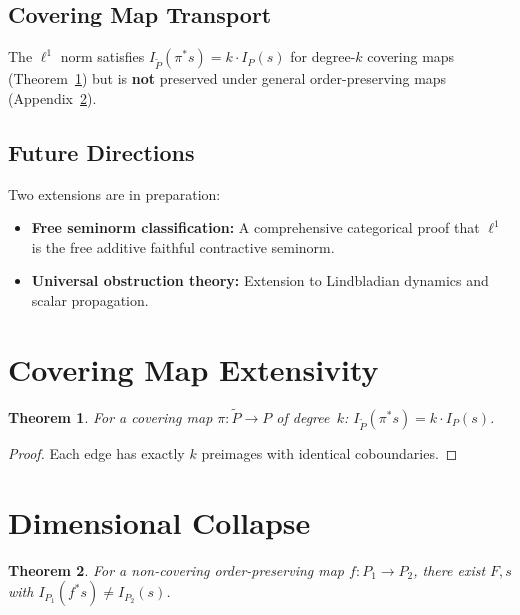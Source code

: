 \documentclass[12pt,a4paper]{amsart}
\theoremstyle{plain}
\newtheorem{theorem}{Theorem}[section]
\theoremstyle{definition}
\theoremstyle{remark}
\begin{document}
\subsection{Covering Map Transport}

The $\ell^1$ norm satisfies
$I_{\tilde{P}}(\pi^* s) = k \cdot I_P(s)$ for degree-$k$ covering
maps (Theorem~\ref{thm:covering}) but is \textbf{not} preserved under
general order-preserving maps (Appendix~\ref{app:collapse}).

\subsection{Future Directions}

Two extensions are in preparation:
\begin{itemize}[leftmargin=2em]
  \item \textbf{Free seminorm classification:}
    A comprehensive categorical proof that $\ell^1$ is the free additive
    faithful contractive seminorm.
  \item \textbf{Universal obstruction theory:}
    Extension to Lindbladian dynamics and scalar propagation.
\end{itemize}



\appendix

\section{Covering Map Extensivity}\label{app:covering}

\begin{theorem}\label{thm:covering}
For a covering map $\pi\colon \tilde{P} \to P$ of degree~$k$:
$I_{\tilde{P}}(\pi^* s) = k \cdot I_P(s)$.
\end{theorem}

\begin{proof}
Each edge has exactly $k$ preimages with identical coboundaries.
\end{proof}

\section{Dimensional Collapse}\label{app:collapse}

\begin{theorem}\label{thm:collapse}
For a non-covering order-preserving map $f\colon P_1 \to P_2$, there
exist $F, s$ with $I_{P_1}(f^*s) \neq I_{P_2}(s)$.
\end{theorem}
\end{document}
